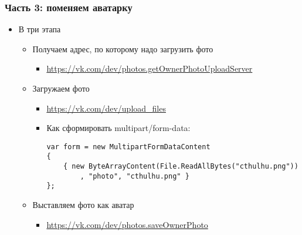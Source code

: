 \documentclass[xetex,mathserif,serif]{beamer}
\begin{document}
	\begin{frame}[fragile]
		\frametitle{Часть 3: поменяем аватарку}
		\begin{itemize}
			\item В три этапа
			\begin{itemize}
				\item Получаем адрес, по которому надо загрузить фото 
				\begin{itemize}
					\item \url{https://vk.com/dev/photos.getOwnerPhotoUploadServer}
				\end{itemize}
				\item Загружаем фото
				\begin{itemize}
					\item \url{https://vk.com/dev/upload_files}
					\item Как сформировать multipart/form-data:
					\begin{verbatim}
var form = new MultipartFormDataContent
{
    { new ByteArrayContent(File.ReadAllBytes("cthulhu.png"))
        , "photo", "cthulhu.png" }
};
					\end{verbatim}
				\end{itemize}
				\item Выставляем фото как аватар
				\begin{itemize}
					\item \url{https://vk.com/dev/photos.saveOwnerPhoto}
				\end{itemize}
			\end{itemize}
		\end{itemize}
	\end{frame}
\end{document}
